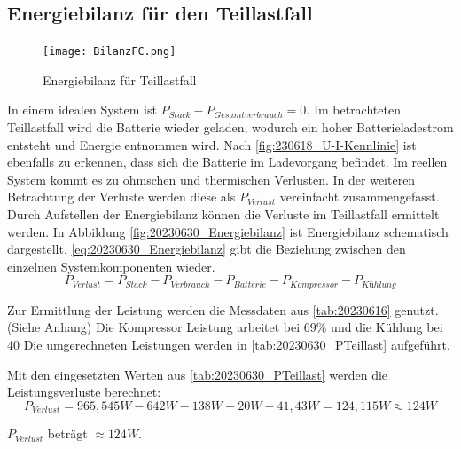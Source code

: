 \newpage
\subsection{Energiebilanz für den Teillastfall}

\begin{figure}[H]
  \texttt{[image: BilanzFC.png]}
\caption{Energiebilanz für Teillastfall}
\label{fig:20230630_Energiebilanz}
\end{figure}

In einem idealen System ist $P_{Stack}-P_{Gesamtverbrauch}=0$. Im betrachteten Teillastfall wird die Batterie wieder geladen, wodurch ein hoher Batterieladestrom entsteht und Energie entnommen wird.
Nach \autoref{fig:230618_U-I-Kennlinie} ist ebenfalls zu erkennen, dass sich die Batterie im Ladevorgang befindet. 
Im reellen System kommt es zu ohmschen und thermischen Verlusten. In der weiteren Betrachtung der Verluste werden diese als $P_{Verlust}$ vereinfacht zusammengefasst.
Durch Aufstellen der Energiebilanz können die Verluste im Teillastfall ermittelt werden.
In Abbildung \autoref{fig:20230630_Energiebilanz} ist Energiebilanz schematisch dargestellt.
\autoref{eq:20230630_Energiebilanz} gibt die Beziehung zwischen den einzelnen Systemkomponenten wieder.
\begin{equation}
  P_{Verlust} = P_{Stack}-P_{Verbrauch}-P_{Batterie}-P_{Kompressor}-P_{Kühlung}
\label{eq:20230630_Energiebilanz}
\end{equation}

Zur Ermittlung der Leistung werden die Messdaten aus \autoref{tab:20230616} genutzt.(Siehe Anhang)
Die Kompressor Leistung arbeitet bei 69\% und die Kühlung bei 40%
Die umgerechneten Leistungen werden in \autoref{tab:20230630_PTeillast} aufgeführt. 


\begin{table}[H]
  \centering
  \caption{Leistungen der Komponenten im Teillastversuch}
  \label{tab:20230630_PTeillast}
  \end{table}

Mit den eingesetzten Werten aus \autoref{tab:20230630_PTeillast} werden die Leistungsverluste berechnet:
$$P_{Verlust}=965,545W-642W-138W-20W-41,43W=124,115W \approx 124W$$

$P_{Verlust}$ beträgt $\approx124W$.

